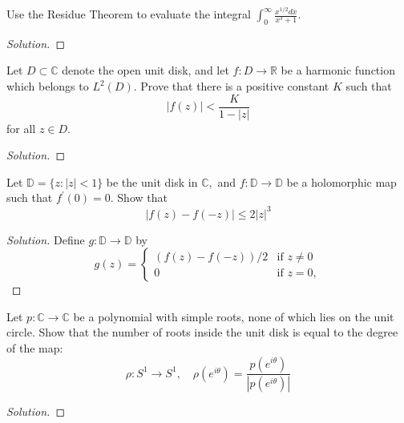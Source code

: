 \documentclass[10pt]{article}
\newenvironment{soln}{\begin{proof}[Solution]}{\end{proof}}
\begin{document}
\begin{problem}
[2017 A-I-4]
Use the Residue Theorem to evaluate the integral $\int_0^{\infty} \frac{x^{1 / 2} d x}{x^3+1}.$
\end{problem}

\begin{soln}

\end{soln}



\begin{problem}
[2017 A-I-6]
Let $D \subset \mathbb{C}$ denote the open unit disk, and let $f: D \rightarrow \mathbb{R}$ be a harmonic function which belongs to $L^2(D).$ Prove that there is a positive constant $K$ such that
$$
|f(z)|<\frac{K}{1-|z|}
$$
for all $z \in D.$
\end{problem}

\begin{soln}

\end{soln}



\begin{problem}
[2016 J-I-4]
Let $\mathbb{D}=\{z:|z|<1\}$ be the unit disk in $\mathbb{C},$ and $f: \mathbb{D} \rightarrow \mathbb{D}$ be a holomorphic map such that $f^{\prime}(0)=0.$ Show that
$$
|f(z)-f(-z)| \leq 2|z|^3
$$
\end{problem}

\begin{soln}
    Define $g\colon\mathbb D\to\mathbb D$ by
    \begin{equation*}
        g(z) = \begin{cases}
	    (f(z) - f(-z))/2 & \text{if }z\ne 0\\
	    0 & \text{if }z = 0,
        \end{cases}
    \end{equation*}
\end{soln}



\begin{problem}
[2016 A-I-4]
Let $p: \mathbb{C} \longrightarrow \mathbb{C}$ be a polynomial with simple roots, none of which lies on the unit circle. Show that the number of roots inside the unit disk is equal to the degree of the map:
$$
\rho: S^1 \longrightarrow S^1, \quad \rho\left(e^{i \theta}\right)=\frac{p\left(e^{i \theta}\right)}{\left|p\left(e^{i \theta}\right)\right|}
$$
\end{problem}

\begin{soln}

\end{soln}
\end{document}
